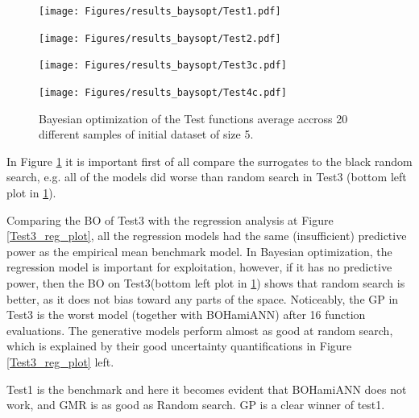 
\begin{figure}[H]
  \centering
  \begin{minipage}[b]{0.49\textwidth}
   \texttt{[image: Figures/results\_baysopt/Test1.pdf]}
  \end{minipage}
  \hfill
  \begin{minipage}[b]{0.49\textwidth}
    \texttt{[image: Figures/results\_baysopt/Test2.pdf]}
   \end{minipage}
   \begin{minipage}[b]{0.49\textwidth}
    \texttt{[image: Figures/results\_baysopt/Test3c.pdf]}
   \end{minipage}
   \hfill
   \begin{minipage}[b]{0.49\textwidth}
     \texttt{[image: Figures/results\_baysopt/Test4c.pdf]}
    \end{minipage}
  \caption{Bayesian optimization of the Test functions average accross 20 different samples of initial dataset of size 5.}
  \label{Test_bayesOpt}
\end{figure}
In Figure \ref{Test_bayesOpt} it is important first of all compare the surrogates to the black random search, e.g.
all of the models did worse than random search in Test3 (bottom left plot in \ref{Test_bayesOpt}).

Comparing the BO of Test3 with the regression analysis at Figure \ref{Test3_reg_plot}, all the
regression models had the same (insufficient) predictive power as the empirical mean benchmark
model. In Bayesian optimization, the regression model is important for exploitation, however, if it
has no predictive power, then the BO on Test3(bottom left plot in \ref{Test_bayesOpt}) shows that
random search is better, as it does not bias toward any parts of the space. Noticeably, the GP in
Test3 is the worst model (together with BOHamiANN) after 16 function evaluations. The generative
models perform almost as good at random search, which is explained by their good uncertainty
quantifications in Figure \ref{Test3_reg_plot} left.

Test1 is the benchmark
and here it becomes evident that BOHamiANN does not work, and GMR is as good as Random search. GP is a clear winner of test1. 


